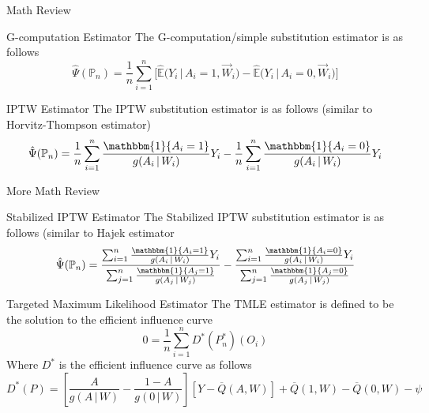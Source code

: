 \documentclass[english]{beamer}
\def\P{\mathbb{P}}
\def\E{\mathbb{E}}
\def\ind{\mathbbm{1}}
\def\giv{{\,|\,}}
\begin{document}
\begin{frame}{Math Review}
\begin{block}{G-computation Estimator}
The G-computation/simple substitution estimator is as follows
$$\hat{\Psi}(\P_n) = \frac{1}{n} \sum_{i=1}^n \bigg[ \hat{\E}\Big(Y_i \giv A_i = 1, \overrightarrow{W}_i\Big) - \hat{\E}\Big(Y_i \giv A_i = 0, \overrightarrow{W}_i\Big) \bigg]$$
\end{block}

\begin{block}{IPTW Estimator}
The IPTW substitution estimator is as follows (similar to Horvitz-Thompson estimator)
$$\hat{\Psi}(\P_n) = \frac{1}{n} \sum_{i=1}^n \frac{\ind\{A_i = 1\}}{g(A_i \giv W_i)} Y_i - \frac{1}{n} \sum_{i=1}^n \frac{\ind\{A_i = 0 \}}{g(A_i \giv W_i)} Y_i$$
\end{block}
\end{frame}

\begin{frame}{More Math Review}
\begin{block}{Stabilized IPTW Estimator}
The Stabilized IPTW substitution estimator is as follows (similar to Hajek estimator
$$\hat{\Psi}(\P_n) = \frac{\sum_{i=1}^n \frac{\ind\{A_i = 1\}}{g(A_i \giv W_i)} Y_i}{\sum_{j=1}^n \frac{\ind\{A_j = 1\}}{g(A_j \giv W_j)}} - \frac{\sum_{i=1}^n \frac{\ind\{A_i = 0 \}}{g(A_i \giv W_i)}Y_i}{\sum_{j=1}^n \frac{\ind\{A_j = 0\}}{g(A_j \giv W_j)}}$$
\end{block}

\begin{block}{Targeted Maximum Likelihood Estimator}
The TMLE estimator is defined to be the solution to the efficient influence curve
$$0 = \frac{1}{n} \sum_{i=1}^n D^*(P_n^*)(O_i)$$
Where $D^*$ is the efficient influence curve as follows
$$D^*(P) = \left[\frac{A}{g(A \giv W)} - \frac{1-A}{g(0 \giv W)}\right][Y-\overline{Q}(A,W)] + \overline{Q}(1, W) - \overline{Q}(0,W) - \psi$$
\end{block}
\end{frame}
\end{document}
